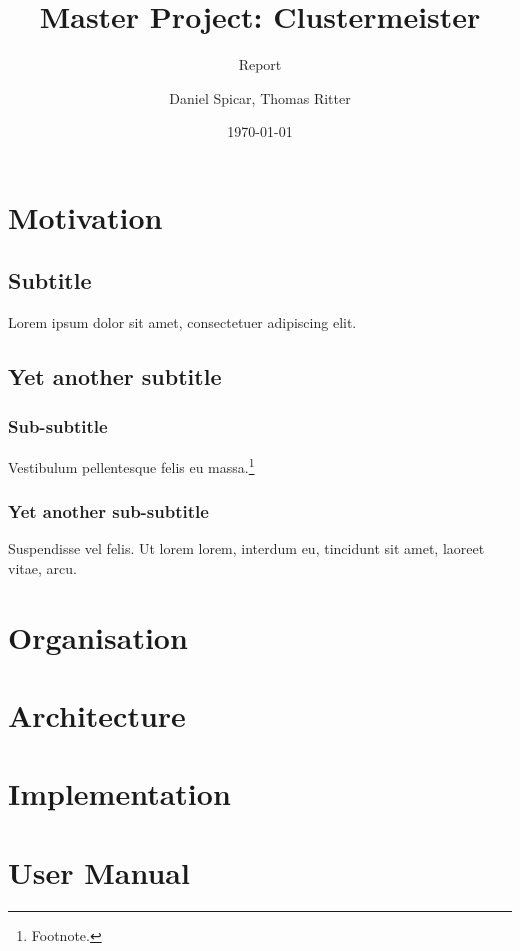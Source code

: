 \documentclass[english]{uzhpub}
\begin{document}
\title{Master Project: Clustermeister}

\subtitle{Report}

\author{Daniel Spicar, Thomas Ritter}

\date{\today}

\maketitle

\section{Motivation}

\subsection{Subtitle}

Lorem ipsum dolor sit amet, consectetuer adipiscing elit.

\subsection{Yet another subtitle}

\subsubsection{Sub-subtitle}

Vestibulum pellentesque felis eu massa.\footnote{Footnote.}

\subsubsection{Yet another sub-subtitle}

Suspendisse vel felis. Ut lorem lorem, interdum eu, tincidunt sit
amet, laoreet vitae, arcu.

\section{Organisation}



\section{Architecture}



\section{Implementation}



\section{User Manual}

\end{document}

